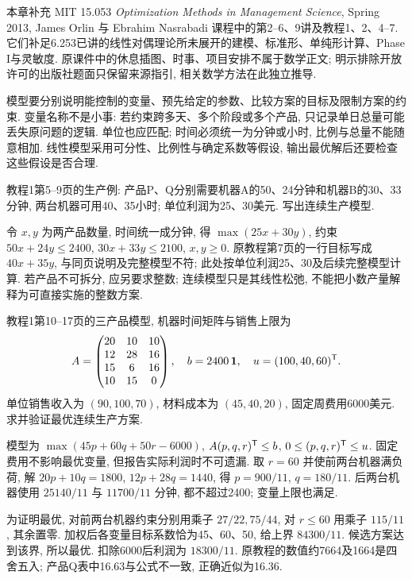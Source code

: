 \label{chap:12}
本章补充 MIT 15.053 \emph{Optimization Methods in Management Science}, Spring 2013, James Orlin 与 Ebrahim Nasrabadi 课程中的第2--6、9讲及教程1、2、4--7. 它们补足6.253已讲的线性对偶理论所未展开的建模、标准形、单纯形计算、Phase I与灵敏度. 原课件中的休息插图、时事、项目安排不属于数学正文; 明示排除开放许可的出版社题面只保留来源指引, 相关数学方法在此独立推导.

模型要分别说明能控制的变量、预先给定的参数、比较方案的目标及限制方案的约束. 变量名称不是小事: 若约束跨多天、多个阶段或多个产品, 只记录单日总量可能丢失原问题的逻辑. 单位也应匹配; 时间必须统一为分钟或小时, 比例与总量不能随意相加. 线性模型采用可分性、比例性与确定系数等假设, 输出最优解后还要检查这些假设是否合理.

\begin{example}
教程1第5--9页的生产例: 产品P、Q分别需要机器A的50、24分钟和机器B的30、33分钟, 两台机器可用40、35小时; 单位利润为25、30美元. 写出连续生产模型.
\end{example}
\begin{solution}
令 $x,y$ 为两产品数量, 时间统一成分钟, 得 $\max(25x+30y)$, 约束 $50x+24y\le2400$, $30x+33y\le2100$, $x,y\ge0$. 原教程第7页的一行目标写成 $40x+35y$, 与同页说明及完整模型不符; 此处按单位利润25、30及后续完整模型计算. 若产品不可拆分, 应另要求整数; 连续模型只是其线性松弛, 不能把小数产量解释为可直接实施的整数方案.
\end{solution}

\begin{example}
教程1第10--17页的三产品模型, 机器时间矩阵与销售上限为
\[
A=\begin{pmatrix}20&10&10\\12&28&16\\15&6&16\\10&15&0\end{pmatrix},\quad
b=2400\,\mathbf1,\quad u=(100,40,60)^{\mathsf T}.
\]
单位销售收入为 $(90,100,70)$, 材料成本为 $(45,40,20)$, 固定周费用6000美元. 求并验证最优连续生产方案.
\end{example}
\begin{solution}
模型为 $\max(45p+60q+50r-6000)$, $A(p,q,r)^{\mathsf T}\le b$, $0\le(p,q,r)^{\mathsf T}\le u$. 固定费用不影响最优变量, 但报告实际利润时不可遗漏. 取 $r=60$ 并使前两台机器满负荷, 解 $20p+10q=1800$, $12p+28q=1440$, 得 $p=900/11$, $q=180/11$. 后两台机器使用 $25140/11$ 与 $11700/11$ 分钟, 都不超过2400; 变量上限也满足.

为证明最优, 对前两台机器约束分别用乘子 $27/22,75/44$, 对 $r\le60$ 用乘子 $115/11$, 其余置零. 加权后各变量目标系数恰为45、60、50, 给上界 $84300/11$. 候选方案达到该界, 所以最优. 扣除6000后利润为 $18300/11$. 原教程的数值约7664及1664是四舍五入; 产品Q表中16.63与公式不一致, 正确近似为16.36.
\end{solution}

